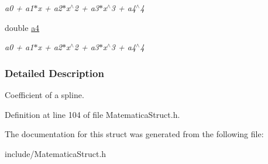 \begin{DoxyCompactItemize}
\begin{DoxyCompactList}\small\item\em a0 + a1$\ast$x + a2$\ast$x$^\wedge$2 + a3$\ast$x$^\wedge$3 + a4$^\wedge$4 \end{DoxyCompactList}\item 
\hypertarget{structSPLINE_ac6ef178808a2e015c97d93c99e52a441}{double \hyperlink{structSPLINE_ac6ef178808a2e015c97d93c99e52a441}{a4}}\label{structSPLINE_ac6ef178808a2e015c97d93c99e52a441}

\begin{DoxyCompactList}\small\item\em a0 + a1$\ast$x + a2$\ast$x$^\wedge$2 + a3$\ast$x$^\wedge$3 + a4$^\wedge$4 \end{DoxyCompactList}\end{DoxyCompactItemize}


\subsubsection{\-Detailed \-Description}
\-Coefficient of a spline. 

\-Definition at line 104 of file \-Matematica\-Struct.\-h.



\-The documentation for this struct was generated from the following file\-:\begin{DoxyCompactItemize}
\item 
include/\-Matematica\-Struct.\-h\end{DoxyCompactItemize}
